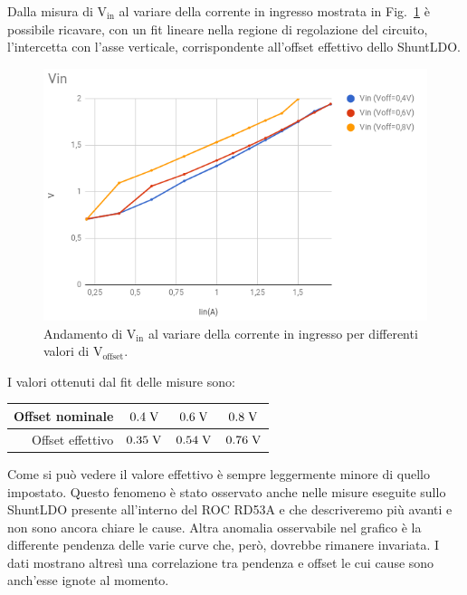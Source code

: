 Dalla misura di $\mathrm{V_{in}}$ al variare della corrente in ingresso mostrata in Fig.~\ref{VinVsVoffset} è possibile ricavare, con un fit lineare nella regione di regolazione del circuito, l'intercetta con l'asse verticale, corrispondente all'offset effettivo dello ShuntLDO. 
\begin{figure}
\centering
\includegraphics[scale=.4]{Immagini/VinVsVoffset}
\caption{Andamento di $\mathrm{V_{in}}$ al variare della corrente in ingresso per differenti valori di $\mathrm{V_{offset}}$.}
\label{VinVsVoffset}
\end{figure}

I valori ottenuti dal fit delle misure sono:

\begin{center}
\begin{tabular}{rccc}
\hline
Offset nominale & $0.4\rm \; V$ & $0.6\rm \; V$ & $0.8\rm \; V$\\
\hline
Offset effettivo & $0.35\rm \; V$ & $0.54\rm \; V$ & $0.76\rm \; V$\\
\hline
\end{tabular}
\end{center}
%
%
%
%

Come si può vedere il valore effettivo è sempre leggermente minore di quello impostato. Questo fenomeno è stato osservato anche nelle misure eseguite sullo ShuntLDO presente all'interno del ROC RD53A e che descriveremo più avanti e non sono ancora chiare le cause. Altra anomalia osservabile nel grafico \`e la differente pendenza delle varie curve che, per\`o, dovrebbe rimanere invariata. I dati mostrano altres\`i una correlazione tra pendenza e offset le cui cause sono anch'esse ignote al momento. %
\FloatBarrier

